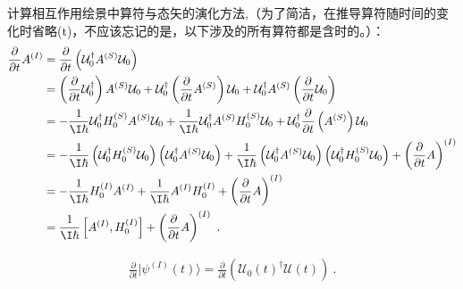 计算相互作用绘景中算符与态矢的演化方法,（为了简洁，在推导算符随时间的变化时省略(t)，不应该忘记的是，以下涉及的所有算符都是含时的。）：
\begin{align}
\frac{\partial}{\partial t}A^{(I)}&=\frac{\partial}{\partial t}\left(\mathcal U_0^\dagger A^{(S)}\mathcal U_0 \right)\\
&=\left(\frac{\partial}{\partial t}\mathcal U_0^\dagger\right) A^{(S)}\mathcal U_0 +\mathcal U_0^\dagger \left(\frac{\partial}{\partial t}A^{(S)}\right)\mathcal U_0+\mathcal U_0^\dagger A^{(S)}\left(\frac{\partial}{\partial t}\mathcal U_0\right)\\
&=-\frac{1}{\I\hbar}\mathcal U_0^\dagger H^{(S)}_0A^{(S)}\mathcal U_0 +\frac{1}{\I\hbar}\mathcal U_0^\dagger A^{(S)}H^{(S)}_0\mathcal U_0+\mathcal U_0^\dagger \frac{\partial}{\partial t}\left(A^{(S)}\right)\mathcal U_0 \\
&=-\frac{1}{\I\hbar}\left(\mathcal U_0^\dagger H^{(S)}_0 \mathcal U_0\right)\left(\mathcal U_0^\dagger A^{(S)}\mathcal U_0\right) +\frac{1}{\I\hbar}\left(\mathcal U_0^\dagger A^{(S)}\mathcal U_0\right)\left(\mathcal U_0^\dagger H^{(S)}_0\mathcal U_0\right)+\left(\frac{\partial}{\partial t}A\right)^{(I)} \\
&=-\frac{1}{\I\hbar} H^{(I)}_0  A^{(I)}+\frac{1}{\I\hbar} A^{(I)} H^{(I)}_0+\left(\frac{\partial}{\partial t}A\right)^{(I)} \\
&=\frac{1}{\I\hbar}\left[A^{(I)},H_0^{(I)}\right]+\left(\frac{\partial}{\partial t}A\right)^{(I)}~.
\end{align}

\begin{align}
\frac{\partial}{\partial t}|\psi^{(I)}(t)\rangle=
\frac{\partial}{\partial t}\left(\mathcal U_0(t)^\dagger\mathcal U(t)\right)~.
\end{align}


